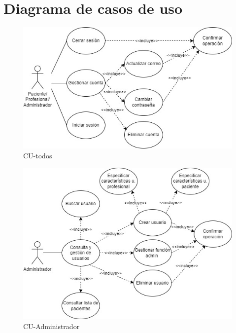 \section{Diagrama de casos de uso}


\begin{figure}[h]
    \centering
    \includegraphics[width=1\textwidth]{img/CUdiagramas/CU-todos.jpg}
    \caption{CU-todos}
    \label{fig:CU-todos}
\end{figure}

\begin{figure}[h]
    \centering
    \includegraphics[width=1\textwidth]{img/CUdiagramas/CU-Administrador.jpg}
    \caption{CU-Administrador}
    \label{fig:CU-Administrador}
\end{figure}


